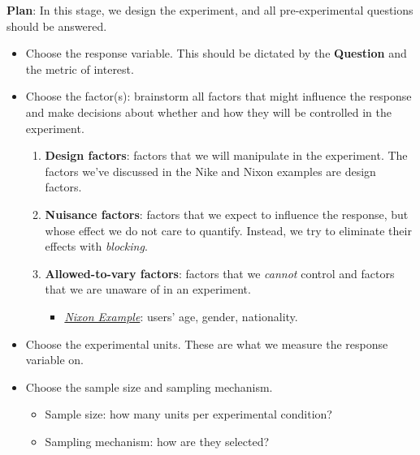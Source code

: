 \begin{framed}
      \textbf{Plan}: In this stage, we design the experiment, and all pre-experimental questions
      should be answered.
      \begin{itemize}
            \item Choose the response variable. This should be dictated by the \textbf{Question} and the metric
                  of interest.
            \item Choose the factor(s): brainstorm all factors that might influence the response and make
                  decisions about whether and how they will be controlled in the experiment.
                  \begin{enumerate}[i]
                        \item \textbf{Design factors}: factors that we will manipulate in the experiment.
                              The factors we've discussed in the Nike and Nixon examples are design factors.
                        \item \textbf{Nuisance factors}: factors that we expect to influence
                              the response, but whose effect we do not care to quantify. Instead, we try to eliminate
                              their effects with \emph{blocking}.
                        \item \textbf{Allowed-to-vary factors}: factors that we \emph{cannot} control and factors that
                              we are unaware of in an experiment.
                              \begin{itemize}
                                    \item \emph{\hyperref[ex:nixon_ex]{Nixon Example}}:
                                          users' age, gender, nationality.
                              \end{itemize}
                  \end{enumerate}
            \item Choose the experimental units. These are what we measure the response variable on.
            \item Choose the sample size and sampling mechanism.
                  \begin{itemize}
                        \item Sample size: how many units per experimental condition?
                        \item Sampling mechanism: how are they selected?
                  \end{itemize}
      \end{itemize}
\end{framed}
